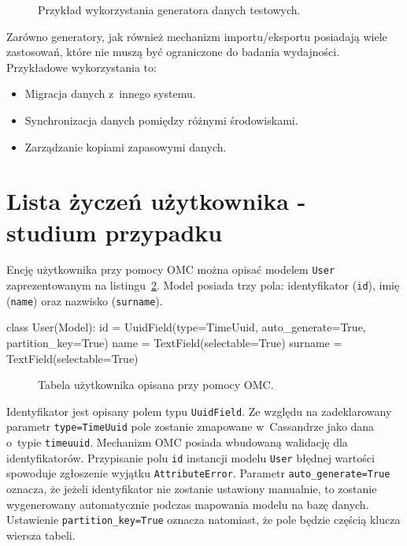 \begin{figure}[ht!]
	\centering
	\theverbbox
	\caption{Przykład wykorzystania generatora danych testowych.}
	\label{vrb:test_data_generator}
\end{figure}

Zarówno generatory, jak również mechanizm importu/eksportu posiadają wiele zastosowań, które nie muszą być ograniczone do badania wydajności. Przykładowe wykorzystania to:

\begin{itemize}
	\item Migracja danych z~innego systemu.
	\item Synchronizacja danych pomiędzy różnymi środowiskami.
	\item Zarządzanie kopiami zapasowymi danych.
\end{itemize}

\section{Lista życzeń użytkownika - studium przypadku}

Encję użytkownika przy pomocy OMC można opisać modelem \verb+User+ zaprezentowanym na listingu~\ref{lst:omc_user_definition}. Model posiada trzy pola: identyfikator (\verb+id+), imię (\verb+name+) oraz nazwisko (\verb+surname+).

\begin{verbbox}
class User(Model):
    id = UuidField(type=TimeUuid, auto_generate=True, partition_key=True)
    name = TextField(selectable=True)
    surname = TextField(selectable=True)
\end{verbbox}

\begin{figure}[ht!]
	\centering
	\theverbbox
	\caption{Tabela użytkownika opisana przy pomocy OMC.}
	\label{lst:omc_user_definition}
\end{figure}

Identyfikator jest opisany polem typu \verb+UuidField+. Ze względu na zadeklarowany parametr \verb+type=TimeUuid+ pole zostanie zmapowane w~Cassandrze jako dana o~typie \verb+timeuuid+. Mechanizm OMC posiada wbudowaną walidację dla identyfikatorów. Przypisanie polu \verb+id+ instancji modelu \verb+User+ błędnej wartości spowoduje zgłoszenie wyjątku \verb+AttributeError+. Parametr \verb+auto_generate=True+ oznacza, że jeżeli identyfikator nie zostanie ustawiony manualnie, to zostanie wygenerowany automatycznie podczas mapowania modelu na bazę danych. Ustawienie \verb+partition_key=True+ oznacza natomiast, że pole będzie częścią klucza wiersza tabeli. 

